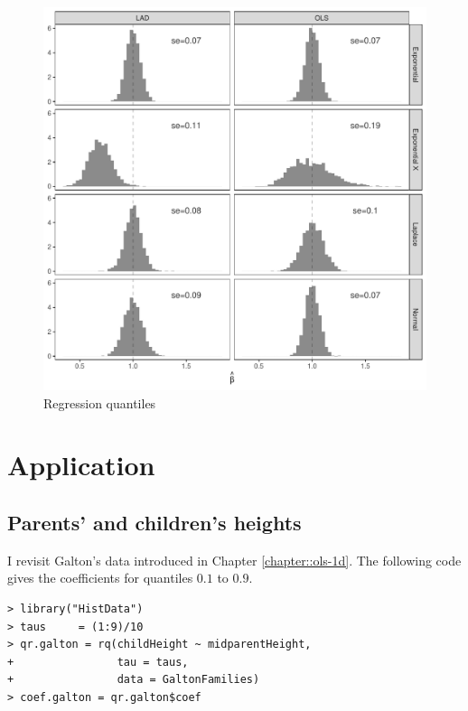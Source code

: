 \begin{figure}[ht]
\centering
\includegraphics[width = \textwidth]{figures/quantile_regression_simu.pdf}
\caption{Regression quantiles}\label{fig::simu-regression-quantiles}
\end{figure}






\section{Application}

\subsection{Parents' and children's heights}



I revisit Galton's data introduced in Chapter \ref{chapter::ols-1d}. The following code gives the coefficients for quantiles $0.1$ to $0.9$. 

\begin{lstlisting}
> library("HistData")
> taus     = (1:9)/10
> qr.galton = rq(childHeight ~ midparentHeight, 
+                tau = taus,
+                data = GaltonFamilies)
> coef.galton = qr.galton$coef
\end{lstlisting} 



